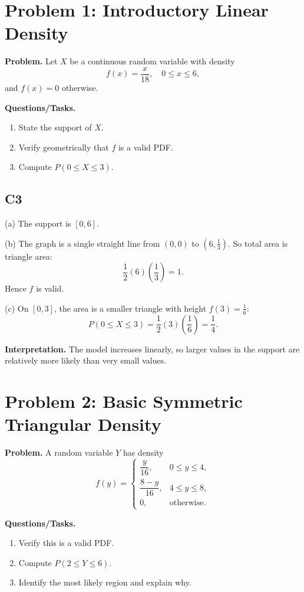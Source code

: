 \section{Problem 1: Introductory Linear Density}

\textbf{Problem.}
Let $X$ be a continuous random variable with density
\[
f(x)=\frac{x}{18},\quad 0\le x\le 6,
\]
and $f(x)=0$ otherwise.

\textbf{Questions/Tasks.}
\begin{enumerate}
\item State the support of $X$.
\item Verify geometrically that $f$ is a valid PDF.
\item Compute $P(0\le X\le 3)$.
\end{enumerate}

\subsection*{C3}
(a) The support is $[0,6]$.

(b) The graph is a single straight line from $(0,0)$ to $(6,\tfrac13)$.
So total area is triangle area:
\[
\frac12(6)\left(\frac13\right)=1.
\]
Hence $f$ is valid.

(c) On $[0,3]$, the area is a smaller triangle with height $f(3)=\frac16$:
\[
P(0\le X\le 3)=\frac12(3)\left(\frac16\right)=\frac14.
\]

\textbf{Interpretation.}
The model increases linearly, so larger values in the support are relatively more likely than very small values.

\section{Problem 2: Basic Symmetric Triangular Density}

\textbf{Problem.}
A random variable $Y$ has density
\[
f(y)=\begin{cases}
\dfrac{y}{16}, & 0\le y\le 4,\\
\dfrac{8-y}{16}, & 4\le y\le 8,\\
0, & \text{otherwise.}
\end{cases}
\]

\textbf{Questions/Tasks.}
\begin{enumerate}
\item Verify this is a valid PDF.
\item Compute $P(2\le Y\le 6)$.
\item Identify the most likely region and explain why.
\end{enumerate}

